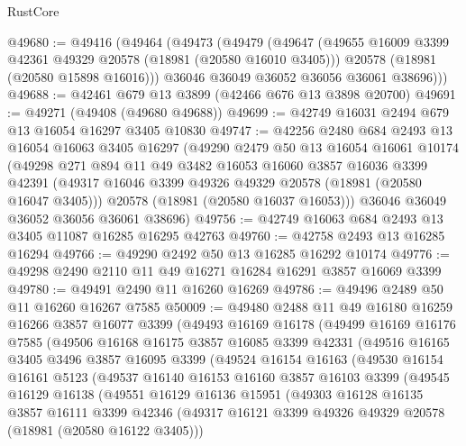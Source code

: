 \begin{lexlean}{RustCore}
\begin{coremodule}
@49680 := @49416
    (@49464
      (@49473
        (@49479
          (@49647
            (@49655 @16009 @3399 @42361 @49329 @20578 (@18981 (@20580 @16010 @3405)))
            @20578
            (@18981 (@20580 @15898 @16016)))
          @36046
          @36049
          @36052
          @36056
          @36061
          @38696)))
@49688 := @42461 @679 @13 @3899 (@42466 @676 @13 @3898 @20700)
@49691 := @49271 (@49408 (@49680 @49688))
@49699 := @42749 @16031 @2494 @679 @13 @16054 @16297 @3405 @10830
@49747 := @42256
    @2480
    @684
    @2493
    @13
    @16054
    @16063
    @3405
    @16297
    (@49290
      @2479
      @50
      @13
      @16054
      @16061
      @10174
      (@49298
        @271
        @894
        @11
        @49
        @3482
        @16053
        @16060
        @3857
        @16036
        @3399
        @42391
        (@49317 @16046 @3399 @49326 @49329 @20578 (@18981 (@20580 @16047 @3405)))
        @20578
        (@18981 (@20580 @16037 @16053)))
      @36046
      @36049
      @36052
      @36056
      @36061
      @38696)
@49756 := @42749 @16063 @684 @2493 @13 @3405 @11087 @16285 @16295 @42763
@49760 := @42758 @2493 @13 @16285 @16294
@49766 := @49290 @2492 @50 @13 @16285 @16292 @10174
@49776 := @49298 @2490 @2110 @11 @49 @16271 @16284 @16291 @3857 @16069 @3399
@49780 := @49491 @2490 @11 @16260 @16269
@49786 := @49496 @2489 @50 @11 @16260 @16267 @7585
@50009 := @49480
    @2488
    @11
    @49
    @16180
    @16259
    @16266
    @3857
    @16077
    @3399
    (@49493
      @16169
      @16178
      (@49499
        @16169
        @16176
        @7585
        (@49506
          @16168
          @16175
          @3857
          @16085
          @3399
          @42331
          (@49516
            @16165
            @3405
            @3496
            @3857
            @16095
            @3399
            (@49524
              @16154
              @16163
              (@49530
                @16154
                @16161
                @5123
                (@49537
                  @16140
                  @16153
                  @16160
                  @3857
                  @16103
                  @3399
                  (@49545
                    @16129
                    @16138
                    (@49551
                      @16129
                      @16136
                      @15951
                      (@49303
                        @16128
                        @16135
                        @3857
                        @16111
                        @3399
                        @42346
                        (@49317 @16121 @3399 @49326 @49329 @20578 (@18981 (@20580 @16122 @3405)))

\end{coremodule}
\end{lexlean}
